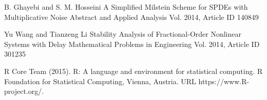 \begin{thebibliography}{00}
B. Ghayebi and S. M. Hosseini
\newblock A Simplified Milstein Scheme for SPDEs with Multiplicative Noise
\newblock Abstract and Applied Analysis Vol. 2014, Article ID 140849

Yu Wang and Tianzeng Li
\newblock Stability Analysis of Fractional-Order Nonlinear Systems with Delay
\newblock Mathematical Problems in Engineering Vol. 2014, Article ID 301235

R Core Team (2015). 
\newblock R: A language and environment for statistical computing. R Foundation for Statistical Computing, Vienna, Austria.
\newblock URL https://www.R-project.org/.

\end{thebibliography}


